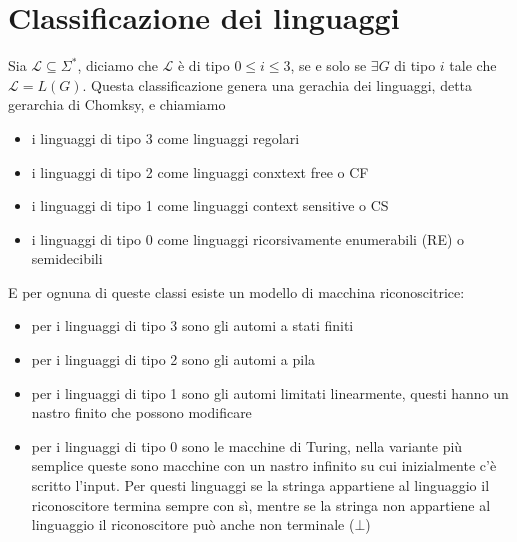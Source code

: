 \documentclass[12pt]{report}
\begin{document}
\section{Classificazione dei linguaggi}
Sia $\mathscr{L} \subseteq \Sigma^*$, diciamo che $\mathscr{L}$ è di tipo $0 \leq i \leq 3$, se e solo se $\exists G$ di tipo $i$ tale che $\mathscr{L} = L(G)$.
Questa classificazione genera una gerachia dei linguaggi, detta gerarchia di Chomksy, e chiamiamo
\begin{itemize}
	\item i linguaggi di tipo 3 come linguaggi regolari
	\item i linguaggi di tipo 2 come linguaggi conxtext free o CF
	\item i linguaggi di tipo 1 come linguaggi context sensitive o CS
	\item i linguaggi di tipo 0 come linguaggi ricorsivamente enumerabili (RE) o semidecibili
\end{itemize}

E per ognuna di queste classi esiste un modello di macchina riconoscitrice:
\begin{itemize}
	\item per i linguaggi di tipo 3 sono gli automi a stati finiti
	\item per i linguaggi di tipo 2 sono gli automi a pila
	\item per i linguaggi di tipo 1 sono gli automi limitati linearmente, questi hanno un nastro finito che possono modificare
	\item per i linguaggi di tipo 0 sono le macchine di Turing, nella variante più semplice queste sono macchine con un nastro infinito su cui inizialmente c'è scritto l'input.
		Per questi linguaggi se la stringa appartiene al linguaggio il riconoscitore termina sempre con sì, mentre se la stringa non appartiene al linguaggio il riconoscitore può anche non terminale ($\bot$)
\end{itemize}
\end{document}
